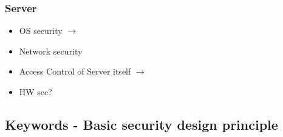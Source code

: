 \subsubsection{Server}
\begin{itemize}
    \item OS security $\rightarrow$ \textit{}
    \item Network security
    \item Access Control of Server itself $\rightarrow$ \textit{}
    \item HW sec?
\end{itemize}

\newpage

\subsection{Keywords - Basic security design principle}
